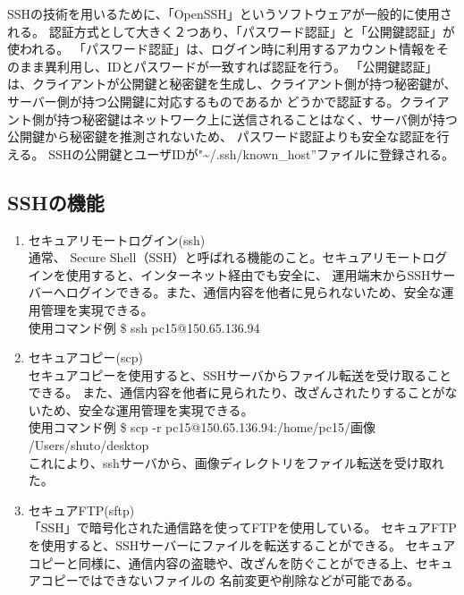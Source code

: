 \documentclass[11pt,a4j,titlepage]{jreport}
\begin{document}
\afterpage{\clearpage}
\newpage

SSHの技術を用いるために、「OpenSSH」というソフトウェアが一般的に使用される。
認証方式として大きく２つあり、「パスワード認証」と「公開鍵認証」が使われる。
「パスワード認証」は、ログイン時に利用するアカウント情報をそのまま異利用し、IDとパスワードが一致すれば認証を行う。
「公開鍵認証」は、クライアントが公開鍵と秘密鍵を生成し、クライアント側が持つ秘密鍵が、サーバー側が持つ公開鍵に対応するものであるか
どうかで認証する。クライアント側が持つ秘密鍵はネットワーク上に送信されることはなく、サーバ側が持つ公開鍵から秘密鍵を推測されないため、
パスワード認証よりも安全な認証を行える。
SSHの公開鍵とユーザIDが"\textasciitilde/.ssh/known\_host''ファイルに登録される。
\subsection{SSHの機能}



\begin{enumerate}
    \item セキュアリモートログイン(ssh)\mbox{}\\通常、
    Secure Shell（SSH）と呼ばれる機能のこと。セキュアリモートログインを使用すると、インターネット経由でも安全に、
    運用端末からSSHサーバーへログインできる。また、通信内容を他者に見られないため、安全な運用管理を実現できる。
    \\使用コマンド例   \$ ssh pc15@150.65.136.94

    \item セキュアコピー(scp)\mbox{}\\セキュアコピーを使用すると、SSHサーバからファイル転送を受け取ることできる。
    また、通信内容を他者に見られたり、改ざんされたりすることがないため、安全な運用管理を実現できる。
    \\使用コマンド例   \$ scp -r pc15@150.65.136.94:/home/pc15/画像 /Users/shuto/desktop\\
    これにより、sshサーバから、画像ディレクトリをファイル転送を受け取れた。

    \item セキュアFTP(sftp)\mbox{}\\
    「SSH」で暗号化された通信路を使ってFTPを使用している。
    セキュアFTPを使用すると、SSHサーバーにファイルを転送することができる。
    セキュアコピーと同様に、通信内容の盗聴や、改ざんを防ぐことができる上、セキュアコピーではできないファイルの
    名前変更や削除などが可能である。
    
\end{enumerate}
\end{document}
